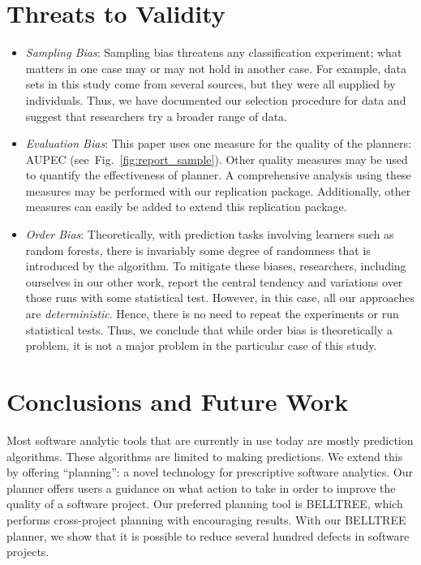 \documentclass[10pt, journal, compsoc]{IEEEtran}
\newcommand{\fig}[1]{Fig.~\ref{fig:#1}}
\begin{document}
\section{Threats to Validity}
\label{sect:threats}
\begin{itemize}[leftmargin=-1pt]
\item[] \textit{Sampling Bias}: Sampling bias threatens any classification experiment;
what matters in one case may or may not hold in another case. 
For example, data sets in this study come from several sources, but they were all supplied by individuals. Thus, we have documented our selection procedure for data and suggest that researchers
try a broader range of data.
\item[] \textit{Evaluation Bias}:
This paper uses one measure for the quality of the planners: AUPEC (see~\fig{report_sample}). Other quality measures may be used to quantify the effectiveness of planner. A comprehensive analysis using these measures may be performed with our replication package. Additionally, other measures can easily be added to extend this replication package.

\item[] \textit{Order Bias}: 
Theoretically, with prediction tasks involving learners such as random forests, there is invariably some degree of randomness that is introduced by the algorithm. To mitigate these biases, researchers, including ourselves in our other work, report the central tendency and variations over those runs with some statistical test. However, in this case, all our approaches are \textit{deterministic}. Hence, there is no need to repeat the experiments or run statistical tests. Thus, we conclude that while order bias is theoretically a problem, 
it is not a major problem in the particular case of this study.
\end{itemize}

\section{Conclusions and Future Work}
\label{sect:future}

Most software analytic tools that are currently in use today are mostly prediction algorithms. These algorithms are limited to making predictions. We extend this by offering ``planning'': a novel technology for prescriptive software analytics. Our planner offers users a guidance on what action to take in order to improve the quality of a software project. Our preferred planning tool is BELLTREE, which performs cross-project planning with encouraging results. With our BELLTREE planner, we show that it is possible to reduce several hundred defects in software projects. 
\end{document}
